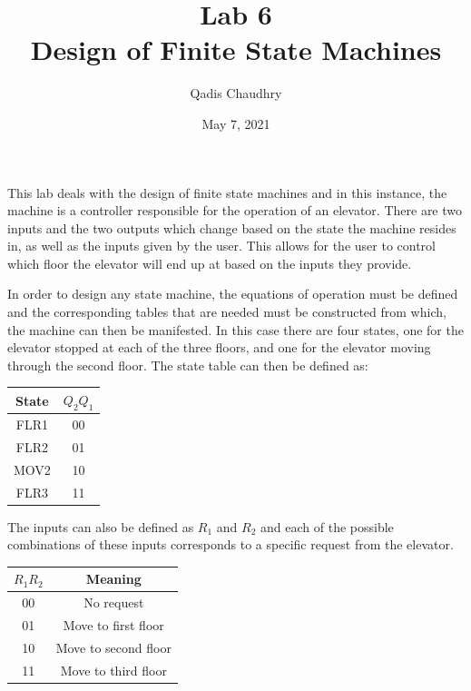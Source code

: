 \documentclass[12pt]{article}
\title{Lab 6 \\ Design of Finite State Machines}
\author{Qadis Chaudhry}
\date{May 7, 2021}
\begin{document}
\maketitle
    \par This lab deals with the design of finite state machines and in this
    instance, the machine is a controller responsible for the operation of an
    elevator.  There are two inputs and the two outputs which change based on
    the state the machine resides in, as well as the inputs given by the user.
    This allows for the user to control which floor the elevator will end up at
    based on the inputs they provide.
    \par In order to design any state machine, the equations of operation must
    be defined and the corresponding tables that are needed must be constructed
    from which, the machine can then be manifested. In this case there are four
    states, one for the elevator stopped at each of the three floors, and one
    for the elevator moving through the second floor. The state table can then
    be defined as:
    \begin{table}[h]
        \centering
        \begin{tabular}{cc}
            \toprule
            State & $Q_2 Q_1$ \\
            \midrule
            FLR1 & 00 \\
            FLR2 & 01 \\
            MOV2 & 10 \\
            FLR3 & 11 \\
            \bottomrule
        \end{tabular}
    \end{table}
    \par The inputs can also be defined as $R_1$ and $R_2$ and each of the
    possible combinations of these inputs corresponds to a specific request from
    the elevator.
    \begin{table}[h]
        \centering
        \begin{tabular}{cc}
            \toprule
            $R_1 R_2$ & Meaning \\
            \midrule
            00 & No request \\
            01 & Move to first floor \\
            10 & Move to second floor \\
            11 & Move to third floor \\
            \bottomrule
        \end{tabular}
    \end{table}
\end{document}
